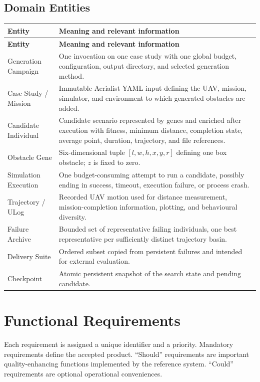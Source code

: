 \documentclass[11pt,a4paper]{report}
\begin{document}
\subsection{Domain Entities}
\begin{longtable}{L{3.2cm} L{11.5cm}}
\toprule
\textbf{Entity} & \textbf{Meaning and relevant information}\\
\midrule
\endfirsthead
\toprule
\textbf{Entity} & \textbf{Meaning and relevant information}\\
\midrule
\endhead
Generation Campaign & One invocation on one case study with one global budget, configuration, output directory, and selected generation method.\\
Case Study / Mission & Immutable Aerialist YAML input defining the UAV, mission, simulator, and environment to which generated obstacles are added.\\
Candidate Individual & Candidate scenario represented by genes and enriched after execution with fitness, minimum distance, completion state, average point, duration, trajectory, and file references.\\
Obstacle Gene & Six-dimensional tuple $[l,w,h,x,y,r]$ defining one box obstacle; $z$ is fixed to zero.\\
Simulation Execution & One budget-consuming attempt to run a candidate, possibly ending in success, timeout, execution failure, or process crash.\\
Trajectory / ULog & Recorded UAV motion used for distance measurement, mission-completion information, plotting, and behavioural diversity.\\
Failure Archive & Bounded set of representative failing individuals, one best representative per sufficiently distinct trajectory basin.\\
Delivery Suite & Ordered subset copied from persistent failures and intended for external evaluation.\\
Checkpoint & Atomic persistent snapshot of the search state and pending candidate.\\
\bottomrule
\end{longtable}

\section{Functional Requirements}
Each requirement is assigned a unique identifier and a priority. Mandatory requirements define the accepted product. ``Should'' requirements are important quality-enhancing functions implemented by the reference system. ``Could'' requirements are optional operational conveniences.
\end{document}
